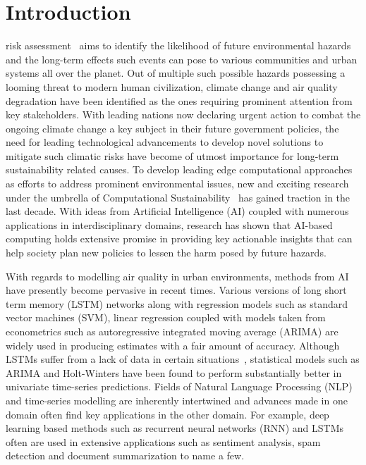 \documentclass[10pt,journal]{IEEEtran}
\begin{document}
\maketitle

\IEEEdisplaynontitleabstractindextext
\IEEEpeerreviewmaketitle


\ifCLASSOPTIONcompsoc
{}
\else
\section{Introduction}
\label{sec:introduction}
\fi

 risk assessment~\cite{Jones.2001} aims to identify the likelihood of future environmental hazards and the long-term effects such events can pose to various communities and urban systems all over the planet. Out of multiple such possible hazards possessing a looming threat to modern human civilization, climate change and air quality degradation have been identified as the ones requiring prominent attention from key stakeholders. With leading nations now declaring urgent action to combat the ongoing climate change a key subject in their future government policies\cite{UN.2015}, the need for leading technological advancements to develop novel solutions to mitigate such climatic risks have become of utmost importance for long-term sustainability related causes. To develop leading edge computational approaches as efforts to address prominent environmental issues, new and exciting research under the umbrella of Computational Sustainability~\cite{Gomes.2019} has gained traction in the last decade. With ideas from Artificial Intelligence (AI) coupled with numerous applications in interdisciplinary domains, research has shown that AI-based computing holds extensive promise in providing key actionable insights that can help society plan new policies to lessen the harm posed by future hazards.

With regards to modelling air quality in urban environments, methods from AI have presently become pervasive in recent times. Various versions of long short term memory (LSTM) networks along with regression models such as standard vector machines (SVM), linear regression coupled with models taken from econometrics such as autoregressive integrated moving average (ARIMA) are widely used in producing estimates with a fair amount of accuracy. Although LSTMs suffer from a lack of data in certain situations~\cite{Nath.2021}, statistical models such as ARIMA and Holt-Winters have been found to perform substantially better in univariate time-series predictions. Fields of Natural Language Processing (NLP) and time-series modelling are inherently intertwined and advances made in one domain often find key applications in the other domain. For example, deep learning based methods such as recurrent neural networks (RNN) and LSTMs often are used in extensive applications such as sentiment analysis, spam detection and document summarization to name a few.
\end{document}
